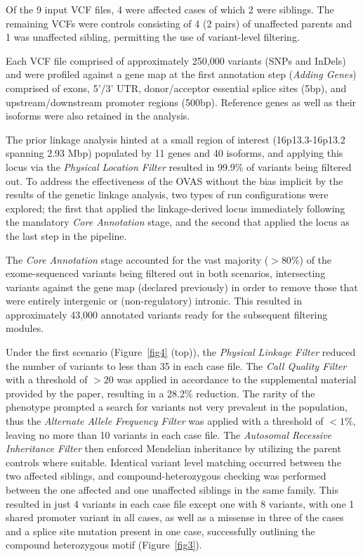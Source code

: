 \documentclass[twocolumn]{bmcart}%
\def\app{OVAS}
\begin{document}
Of the 9 input VCF files, 4 were affected cases of which 2 were siblings. The remaining VCFs were controls consisting of 4 (2 pairs) of unaffected parents and 1 was unaffected sibling, permitting the use of variant-level filtering.

Each VCF file comprised of approximately 250,000 variants (SNPs and InDels) and were profiled against a gene map at the first annotation step (\textit{Adding Genes}) comprised of exons, 5'/3' UTR, donor/acceptor essential splice sites (5bp), and upstream/downstream promoter regions (500bp). Reference genes as well as their isoforms were also retained in the analysis.

The prior linkage analysis hinted at a small region of interest (16p13.3-16p13.2 spanning 2.93 Mbp) populated by 11 genes and 40 isoforms, and applying this locus via the \textit{Physical Location Filter} resulted in 99.9\% of variants being filtered out. To address the effectiveness of the \app{} without the bias implicit by the results of the genetic linkage analysis, two types of run configurations were explored; the first that applied the linkage-derived locus immediately following the mandatory \textit{Core Annotation} stage, and the second that applied the locus as the last step in the pipeline.

The \textit{Core Annotation} stage accounted for the vast majority ($ > 80\% $) of the exome-sequenced variants being filtered out in both scenarios, intersecting variants against the gene map (declared previously) in order to remove those that were entirely intergenic or (non-regulatory) intronic. This resulted in approximately 43,000 annotated variants ready for the subsequent filtering modules.

Under the first scenario (Figure~\ref{fig4} (top)), the \textit{Physical Linkage Filter} reduced the number of variants to less than 35 in each case file. The \textit{Call Quality Filter} with a threshold of $>20$ was applied in accordance to the supplemental material provided by the paper, resulting in a 28.2\% reduction. The rarity of the phenotype prompted a search for variants not very prevalent in the population, thus the \textit{Alternate Allele Frequency Filter} was applied with a threshold of $< 1\%$, leaving no more than 10 variants in each case file. The \textit{Autosomal Recessive Inheritance Filter} then enforced Mendelian inheritance by utilizing the parent controls where suitable. Identical variant level matching occurred between the two affected siblings, and compound-heterozygous checking was performed between the one affected and one unaffected siblings in the same family. This resulted in just 4 variants in each case file except one with 8 variants, with one 1 shared promoter variant in all cases, as well as a missense in three of the cases and a splice site mutation present in one case, successfully outlining the compound heterozygous motif (Figure~\ref{fig3}). 
\end{document}
